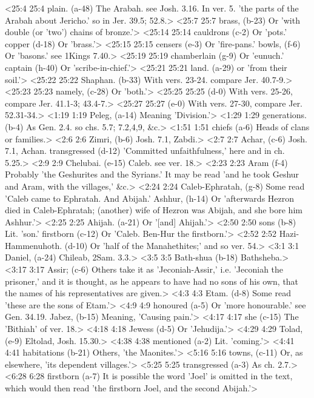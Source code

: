 <25:4 25:4  plain. (a-48)  The Arabah. see Josh. 3.16. In ver. 5. 'the parts of the  Arabah about Jericho.' so in Jer. 39.5; 52.8.>
<25:7 25:7  brass, (b-23)  Or 'with double (or 'two') chains of bronze.'>
<25:14 25:14  cauldrons (c-2)  Or 'pots.'  copper (d-18)  Or 'brass.'>
<25:15 25:15  censers (e-3)  Or 'fire-pans.'
  bowls, (f-6)  Or 'basons.' see 1Kings 7.40.>
<25:19 25:19  chamberlain (g-9)  Or 'eunuch.'
  captain (h-40)  Or 'scribe-in-chief.'>
<25:21 25:21  land. (a-29)  or 'from their soil.'>
<25:22 25:22  Shaphan. (b-33)  With vers. 23-24. compare Jer. 40.7-9.>
<25:23 25:23  namely, (c-28)  Or 'both.'>
<25:25 25:25   (d-0)  With vers. 25-26, compare Jer. 41.1-3; 43.4-7.>
<25:27 25:27   (e-0)  With vers. 27-30, compare Jer. 52.31-34.>
<1:19 1:19  Peleg, (a-14)  Meaning 'Division.'>
<1:29 1:29  generations. (b-4)  As Gen. 2.4. so chs. 5.7; 7.2,4,9, &c.>
<1:51 1:51  chiefs (a-6)  Heads of clans or families.>
<2:6 2:6  Zimri, (b-6)  Josh. 7.1, Zabdi.>
<2:7 2:7  Achar, (c-6)  Josh. 7.1, Achan.
  transgressed (d-12)  'Committed unfaithfulness,' here and in ch. 5.25.>
<2:9 2:9  Chelubai. (e-15)  Caleb. see ver. 18.>
<2:23 2:23  Aram (f-4)  Probably 'the Geshurites and the Syrians.' It may be read  'and he took Geshur and Aram, with the villages,' &c.>
<2:24 2:24  Caleb-Ephratah, (g-8)  Some read 'Caleb came to Ephratah. And Abijah.'
  Ashhur, (h-14)  Or 'afterwards Hezron died in Caleb-Ephratah; (another) wife  of Hezron was Abijah, and she bore him Ashhur.'>
<2:25 2:25  Ahijah. (a-21)  Or '[and] Ahijah.'>
<2:50 2:50  sons (b-8)  Lit. 'son.'
  firstborn (c-12)  Or 'Caleb. Ben-Hur the firstborn.'>
<2:52 2:52  Hazi-Hammenuhoth. (d-10)  Or 'half of the Manahethites;' and so ver. 54.>
<3:1 3:1  Daniel, (a-24)  Chileab, 2Sam. 3.3.>
<3:5 3:5  Bath-shua (b-18)  Bathsheba.>
<3:17 3:17  Assir; (c-6)  Others take it as 'Jeconiah-Assir,' i.e. 'Jeconiah the  prisoner,' and it is thought, as he appears to have had no sons  of his own, that the names of his representatives are given.>
<4:3 4:3  Etam. (d-8)  Some read 'these are the sons of Etam.'>
<4:9 4:9  honoured (a-5)  Or 'more honourable.' see Gen. 34.19.
  Jabez, (b-15)  Meaning, 'Causing pain.'>
<4:17 4:17  she (c-15)  The 'Bithiah' of ver. 18.>
<4:18 4:18  Jewess (d-5)  Or 'Jehudija.'>
<4:29 4:29  Tolad, (e-9)  Eltolad, Josh. 15.30.>
<4:38 4:38  mentioned (a-2)  Lit. 'coming.'>
<4:41 4:41  habitations (b-21)  Others, 'the Maonites.'>
<5:16 5:16  towns, (c-11)  Or, as elsewhere, 'its dependent villages.'>
<5:25 5:25  transgressed (a-3)  As ch. 2.7.>
<6:28 6:28  firstborn (a-7)  It is possible the word 'Joel' is omitted in the text, which  would then read 'the firstborn Joel, and the second Abijah.'>
